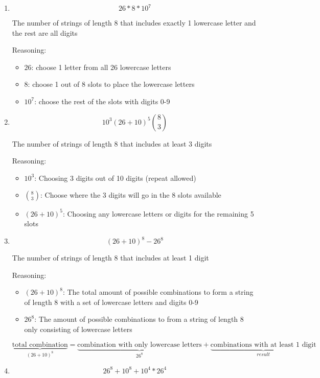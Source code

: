 \documentclass[10pt,letterpaper,unboxed,cm]{article}
\begin{document}
\begin{enumerate}
\begin{enumerate}
\item

$$26*8*10^7$$

The number of strings of length 8 that includes exactly 1 lowercase letter and the rest are all digits

Reasoning:
\begin{itemize}
    \item $26$: choose 1 letter from all 26 lowercase letters
    \item $8$: choose 1 out of 8 slots to place the lowercase letters
    \item $10^7$: choose the rest of the slots with digits 0-9
\end{itemize}
\item

$$10^3(26 + 10)^{5}{8\choose 3}$$

The number of strings of length 8 that includes at least 3 digits

Reasoning:
\begin{itemize}
    \item $10^3$: Choosing 3 digits out of 10 digits (repeat allowed)
    \item $\binom{8}{3}$: Choose where the 3 digits will go in the 8 slots available
    \item $(26+10)^5$: Choosing any lowercase letters or digits for the remaining 5 slots
\end{itemize}
\item

$$(26 + 10)^{8} - 26^8$$

The number of strings of length 8 that includes at least 1 digit

Reasoning:
\begin{itemize}
    \item $(26+10)^8$: The total amount of possible combinations to form a string of length 8 with a set of lowercase letters and digits 0-9
    \item $26^8$: The amount of possible combinations to from a string of length 8 only consisting of lowercase letters
\end{itemize}
$$
\underbrace{\text{total combination}}_{(26+10)^8} = \underbrace{\text{combination with only lowercase letters}}_{26^8} + \underbrace{\text{combinations with at least 1 digit}}_{result}
$$

\item
$$26^8 + 10^8 + 10^4*26^4$$


\end{enumerate}
\end{enumerate}
\end{document}
